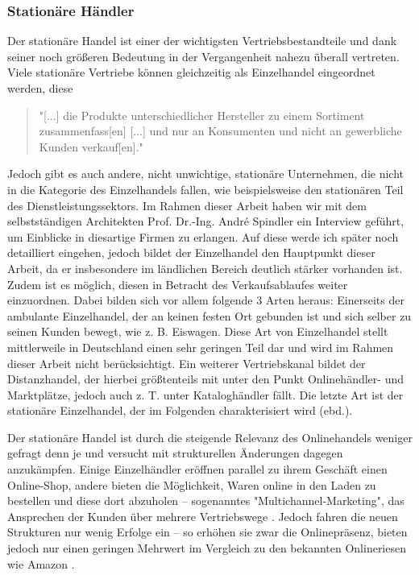 \begin{folding} \subsubsection{Stationäre Händler}
Der stationäre Handel ist einer der wichtigsten Vertriebsbestandteile und dank seiner noch größeren Bedeutung in der Vergangenheit nahezu überall vertreten. Viele stationäre Vertriebe können gleichzeitig als Einzelhandel eingeordnet werden, diese
\begin{quote}
    "[...] die Produkte unterschiedlicher Hersteller zu einem Sortiment zusammenfass[en] [...] und nur an Konsumenten und nicht an gewerbliche Kunden verkauf[en]." \cite[S. 20]{Ebert}
\end{quote}
Jedoch gibt es auch andere, nicht unwichtige, stationäre Unternehmen, die nicht in die Kategorie des Einzelhandels fallen, wie beispielsweise den stationären Teil des Dienstleistungssektors. Im Rahmen dieser Arbeit haben wir mit dem selbstständigen Architekten Prof. Dr.-Ing. André Spindler ein Interview geführt, um Einblicke in diesartige Firmen zu erlangen. Auf diese werde ich später noch detailliert eingehen, jedoch bildet der Einzelhandel den Hauptpunkt dieser Arbeit, da er insbesondere im ländlichen Bereich deutlich stärker vorhanden ist. Zudem ist es möglich, diesen in Betracht des Verkaufsablaufes weiter einzuordnen. Dabei bilden sich vor allem folgende 3 Arten heraus: Einerseits der ambulante Einzelhandel, der an keinen festen Ort gebunden ist und sich selber zu seinen Kunden bewegt, wie z. B. Eiswagen. Diese Art von Einzelhandel stellt mittlerweile in Deutschland einen sehr geringen Teil dar und wird im Rahmen dieser Arbeit nicht berücksichtigt. Ein weiterer Vertriebskanal bildet der Distanzhandel, der hierbei größtenteils mit unter den Punkt Onlinehändler- und Marktplätze, jedoch auch z. T. unter Kataloghändler fällt. Die letzte Art ist der stationäre Einzelhandel, der im Folgenden charakterisiert wird (ebd.).

Der stationäre Handel ist durch die steigende Relevanz des Onlinehandels weniger gefragt denn je und versucht mit strukturellen Änderungen dagegen anzukämpfen. Einige Einzelhändler eröffnen parallel zu ihrem Geschäft einen Online-Shop, andere bieten die Möglichkeit, Waren online in den Laden zu bestellen und diese dort abzuholen – sogenanntes "Multichannel-Marketing", das Ansprechen der Kunden über mehrere Vertriebswege \cite[S. 34f]{Graf}. Jedoch fahren die neuen Strukturen nur wenig Erfolge ein – so erhöhen sie zwar die Onlinepräsenz, bieten jedoch nur einen geringen Mehrwert im Vergleich zu den bekannten Onlineriesen wie Amazon \cite[S. 34f]{Graf}. 


\end{folding}
